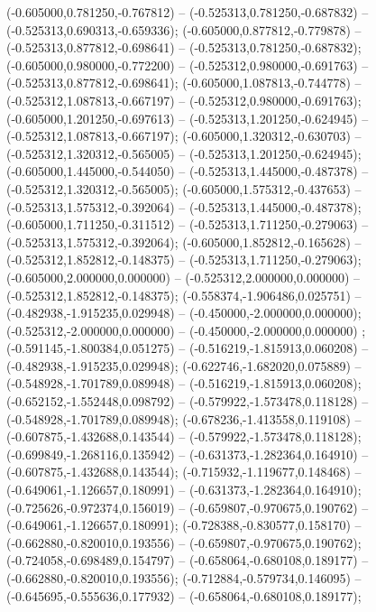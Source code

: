  (-0.605000,0.781250,-0.767812) -- (-0.525313,0.781250,-0.687832) -- (-0.525313,0.690313,-0.659336);
 (-0.605000,0.877812,-0.779878) -- (-0.525313,0.877812,-0.698641) -- (-0.525313,0.781250,-0.687832);
 (-0.605000,0.980000,-0.772200) -- (-0.525312,0.980000,-0.691763) -- (-0.525313,0.877812,-0.698641);
 (-0.605000,1.087813,-0.744778) -- (-0.525312,1.087813,-0.667197) -- (-0.525312,0.980000,-0.691763);
 (-0.605000,1.201250,-0.697613) -- (-0.525313,1.201250,-0.624945) -- (-0.525312,1.087813,-0.667197);
 (-0.605000,1.320312,-0.630703) -- (-0.525312,1.320312,-0.565005) -- (-0.525313,1.201250,-0.624945);
 (-0.605000,1.445000,-0.544050) -- (-0.525313,1.445000,-0.487378) -- (-0.525312,1.320312,-0.565005);
 (-0.605000,1.575312,-0.437653) -- (-0.525313,1.575312,-0.392064) -- (-0.525313,1.445000,-0.487378);
 (-0.605000,1.711250,-0.311512) -- (-0.525313,1.711250,-0.279063) -- (-0.525313,1.575312,-0.392064);
 (-0.605000,1.852812,-0.165628) -- (-0.525312,1.852812,-0.148375) -- (-0.525313,1.711250,-0.279063);
 (-0.605000,2.000000,0.000000) -- (-0.525312,2.000000,0.000000) -- (-0.525312,1.852812,-0.148375);
 (-0.558374,-1.906486,0.025751) -- (-0.482938,-1.915235,0.029948) -- (-0.450000,-2.000000,0.000000);
 (-0.525312,-2.000000,0.000000) -- (-0.450000,-2.000000,0.000000) ;
 (-0.591145,-1.800384,0.051275) -- (-0.516219,-1.815913,0.060208) -- (-0.482938,-1.915235,0.029948);
 (-0.622746,-1.682020,0.075889) -- (-0.548928,-1.701789,0.089948) -- (-0.516219,-1.815913,0.060208);
 (-0.652152,-1.552448,0.098792) -- (-0.579922,-1.573478,0.118128) -- (-0.548928,-1.701789,0.089948);
 (-0.678236,-1.413558,0.119108) -- (-0.607875,-1.432688,0.143544) -- (-0.579922,-1.573478,0.118128);
 (-0.699849,-1.268116,0.135942) -- (-0.631373,-1.282364,0.164910) -- (-0.607875,-1.432688,0.143544);
 (-0.715932,-1.119677,0.148468) -- (-0.649061,-1.126657,0.180991) -- (-0.631373,-1.282364,0.164910);
 (-0.725626,-0.972374,0.156019) -- (-0.659807,-0.970675,0.190762) -- (-0.649061,-1.126657,0.180991);
 (-0.728388,-0.830577,0.158170) -- (-0.662880,-0.820010,0.193556) -- (-0.659807,-0.970675,0.190762);
 (-0.724058,-0.698489,0.154797) -- (-0.658064,-0.680108,0.189177) -- (-0.662880,-0.820010,0.193556);
 (-0.712884,-0.579734,0.146095) -- (-0.645695,-0.555636,0.177932) -- (-0.658064,-0.680108,0.189177);
